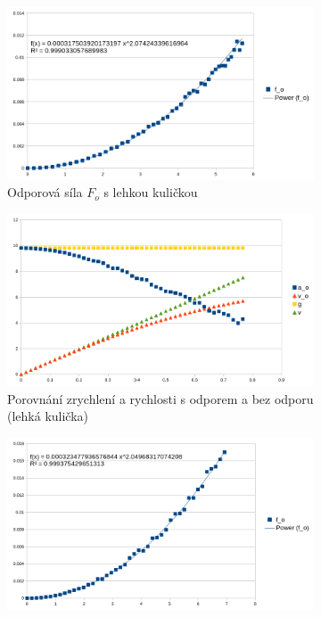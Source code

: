 \documentclass{fkssolpub}
\begin{document}
\begin{figure}[h!]
	\caption{Grafy}
	\begin{subfigure}[b]{0.5\textwidth}
		\centering
		\includegraphics[width=\textwidth]{6-fig1.png}
		\caption{Odporová síla $F_o$ s lehkou kuličkou}
		\label{fig:a}
	\end{subfigure}
	\begin{subfigure}[b]{0.5\textwidth}
		\centering
		\includegraphics[width=\textwidth]{6-fig2.png}
		\caption{Porovnání zrychlení a rychlosti s odporem a bez odporu (lehká kulička)}
		\label{fig:b}
	\end{subfigure}
	\begin{subfigure}[b]{0.5\textwidth}
		\centering
		\includegraphics[width=\textwidth]{6-fig3.png}

\end{subfigure}
\end{figure}
\end{document}
